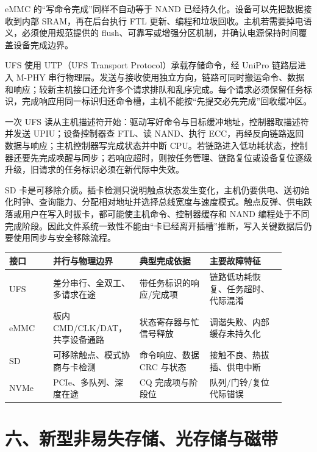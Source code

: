 eMMC 的“写命令完成”同样不自动等于 NAND 已经持久化。设备可以先把数据接收到内部 SRAM，再在后台执行 FTL 更新、编程和垃圾回收。主机若需要掉电语义，必须使用规范提供的 flush、可靠写或增强分区机制，并确认电源保持时间覆盖设备完成边界。


UFS 使用 UTP（UFS Transport Protocol）承载存储命令，经 UniPro 链路层进入 M-PHY 串行物理层。发送与接收使用独立方向，链路可同时搬运命令、数据和响应；较新主机接口还允许多个请求排队和乱序完成。每个请求必须保留任务标识，完成响应用同一标识归还命令槽，主机不能按“先提交必先完成”回收缓冲区。

一次 UFS 读从主机描述符开始：驱动写好命令与目标缓冲地址，控制器取描述符并发送 UPIU；设备控制器查 FTL、读 NAND、执行 ECC，再经反向链路返回数据与响应；主机控制器写完成状态并中断 CPU。若链路进入低功耗状态，控制器还要先完成唤醒与同步；若响应超时，则按任务管理、链路复位或设备复位逐级升级，旧请求的任务标识必须在新代际中失效。


SD 卡是可移除介质。插卡检测只说明触点状态发生变化，主机仍要供电、送初始化时钟、查询能力、分配相对地址并选择总线宽度与速度模式。触点反弹、供电跌落或用户在写入时拔卡，都可能使主机命令、控制器缓存和 NAND 编程处于不同完成阶段。因此文件系统一致性不能由“卡已经离开插槽”推断，写入关键数据后仍要使用同步与安全移除流程。

\begin{longtable}{L{0.15\linewidth}L{0.25\linewidth}L{0.24\linewidth}L{0.26\linewidth}}
\toprule
接口 & 并行与物理边界 & 典型完成依据 & 主要故障特征 \\
\midrule
UFS & 差分串行、全双工、多请求在途 & 带任务标识的响应/完成项 & 链路低功耗恢复、任务超时、代际混淆 \\\tablerowrule
eMMC & 板内 CMD/CLK/DAT，共享设备通路 & 状态寄存器与忙信号释放 & 调谐失败、内部缓存未持久化 \\\tablerowrule
SD & 可移除触点、模式协商与卡检测 & 命令响应、数据 CRC 与状态 & 接触不良、热拔插、供电中断 \\\tablerowrule
NVMe & PCIe、多队列、深度在途 & CQ 完成项与阶段位 & 队列/门铃/复位代际错误 \\
\bottomrule
\end{longtable}

\section{六、新型非易失存储、光存储与磁带}

